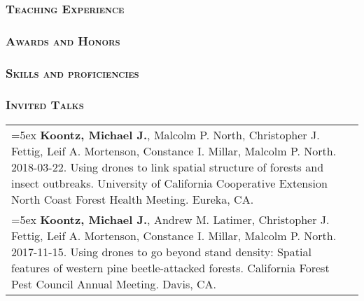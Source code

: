 \documentclass[10pt,english]{article}
\providecommand{\tabularnewline}{\\}
\begin{document}
\subsubsection*{\textsc{Teaching Experience}}
\vspace{-0.5ex}


\vspace{1ex}


\subsubsection*{\textsc{Awards and Honors}}


\vspace{1ex}


\subsubsection*{\textsc{Skills and proficiencies}}
\vspace{-0.5ex}


\vspace{1ex}


\subsubsection*{\textsc{Invited Talks}}
\vspace{-0.5ex}

\renewcommand{\arraystretch}{1.2}
\begin{tabularx}{\textwidth}{@{}>{\raggedright}p{5.25in} >{\raggedleft}X@{}}

\hangindent=5ex \textbf{Koontz, Michael J.}, Malcolm P. North, Christopher J. Fettig, Leif A. Mortenson, Constance I. Millar, Malcolm P. North. 2018-03-22. Using drones to link spatial structure of forests and insect outbreaks. University of California Cooperative Extension North Coast Forest Health Meeting. Eureka, CA. & 2018 \tabularnewline

\hangindent=5ex \textbf{Koontz, Michael J.}, Andrew M. Latimer, Christopher J. Fettig, Leif A. Mortenson, Constance I. Millar, Malcolm P. North. 2017-11-15. Using drones to go beyond stand density: Spatial features of western pine beetle-attacked forests. California Forest Pest Council Annual Meeting. Davis, CA. & 2017

\end{tabularx}
\vspace{1ex}
\end{document}

